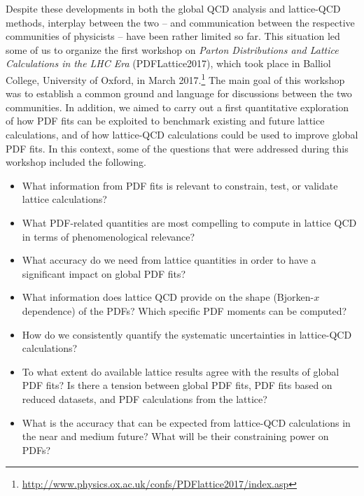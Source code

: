Despite these developments in both the global QCD analysis and lattice-QCD 
methods, interplay between the two -- and communication between the 
respective communities of physicists -- have been rather limited so far.
%
This situation led some of us to organize the first workshop on
{\it Parton Distributions and Lattice Calculations in the LHC Era}
(PDFLattice2017), which took place in Balliol College, University of 
Oxford, in March 2017.\footnote{\url{http://www.physics.ox.ac.uk/confs/PDFlattice2017/index.asp}}
%
The main goal of this workshop was to establish a common ground 
and language for discussions between the two communities.
%
In addition, we aimed to carry out a first quantitative exploration of how PDF 
fits can be exploited to benchmark existing and future lattice calculations,
and of how lattice-QCD calculations could be used to improve global PDF fits.
%
In this context, some of the questions that were addressed during this workshop
included the following.
\begin{itemize}
\item What information from PDF fits is relevant to constrain, 
  test, or validate lattice calculations?

\item What PDF-related quantities are most compelling
  to compute in lattice QCD in terms of phenomenological relevance?

\item What accuracy do we need from lattice quantities 
  in order to have a significant impact on global PDF fits?

\item What information does lattice QCD provide on the
  shape (Bjorken-$x$ dependence) of the PDFs? Which specific
  PDF moments can be computed?
  
\item How do we consistently quantify the systematic uncertainties 
  in lattice-QCD calculations?

\item To what extent do available lattice results agree with the results of
  global PDF fits? Is there a tension between global PDF fits, PDF
  fits based on reduced datasets, and PDF calculations from the lattice?

\item What is the accuracy that can be expected from lattice-QCD
  calculations in the near and medium future? What will be their
  constraining power on PDFs?

\end{itemize}

